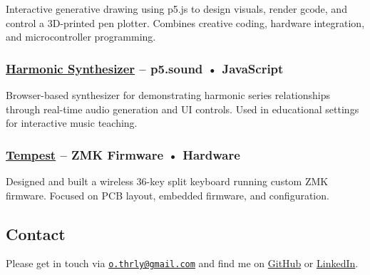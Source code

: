 \documentclass[11pt,a4paper]{article}
\begin{document}
Interactive generative drawing using p5.js to design visuals, render
gcode, and control a 3D-printed pen plotter. Combines creative coding,
hardware integration, and microcontroller programming.

\subsubsection{\texorpdfstring{\href{https://github.com/thrly/harmonic-synth}{Harmonic
Synthesizer} -- p5.sound •
JavaScript}{Harmonic Synthesizer -- p5.sound • JavaScript}}\label{harmonic-synthesizer-p5.sound-javascript}

Browser-based synthesizer for demonstrating harmonic series
relationships through real-time audio generation and UI controls. Used
in educational settings for interactive music teaching.

\subsubsection{\texorpdfstring{\href{https://github.com/thrly/tempest-keyboard}{Tempest}
-- ZMK Firmware •
Hardware}{Tempest -- ZMK Firmware • Hardware}}\label{tempest-zmk-firmware-hardware}

Designed and built a wireless 36-key split keyboard running custom ZMK
firmware. Focused on PCB layout, embedded firmware, and configuration.

\subsection{Contact}\label{contact}

Please get in touch via
\href{mailto:o.thrly@gmail.com}{\nolinkurl{o.thrly@gmail.com}} and find
me on \href{https://github.com/thrly}{GitHub} or
\href{https://www.linkedin.com/in/oliver-thurley}{LinkedIn}.
\end{document}
